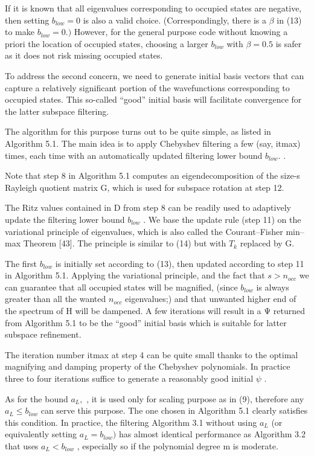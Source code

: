 \documentclass[
  10
]{article}
\begin{document}
If it is known that all eigenvalues corresponding to occupied states are
negative, then setting \(b _ { l o w } = 0\) is also a valid choice.
(Correspondingly, there is a \(\beta\) in (13) to make
\(b _ { l o w } = 0 . )\) However, for the general purpose code without
knowing a priori the location of occupied states, choosing a larger
\(b _ { l o w }\) with \(\beta = 0 . 5\) is safer as it does not risk
missing occupied states.

To address the second concern, we need to generate initial basis vectors
that can capture a relatively significant portion of the wavefunctions
corresponding to occupied states. This so-called ``good'' initial basis
will facilitate convergence for the latter subspace filtering.

The algorithm for this purpose turns out to be quite simple, as listed
in Algorithm 5.1. The main idea is to apply Chebyshev filtering a few
(say, itmax) times, each time with an automatically updated filtering
lower bound \(b _ { l o w } .\) .

Note that step 8 in Algorithm 5.1 computes an eigendecomposition of the
size-s Rayleigh quotient matrix G, which is used for subspace rotation
at step 12.

The Ritz values contained in D from step 8 can be readily used to
adaptively update the filtering lower bound \(b _ { l o w }\) . We base
the update rule (step 11) on the variational principle of eigenvalues,
which is also called the Courant--Fisher min--max Theorem {[}43{]}. The
principle is similar to (14) but with \(T _ { k }\) replaced by G.

The first \(b _ { l o w }\) is initially set according to (13), then
updated according to step 11 in Algorithm 5.1. Applying the variational
principle, and the fact that \(s > n _ { o c c }\) we can guarantee that
all occupied states will be magnified, (since \(b _ { l o w }\) is
always greater than all the wanted \(n _ { o c c }\) eigenvalues;) and
that unwanted higher end of the spectrum of H will be dampened. A few
iterations will result in a Ψ returned from Algorithm 5.1 to be the
``good'' initial basis which is suitable for latter subspace refinement.

The iteration number itmax at step 4 can be quite small thanks to the
optimal magnifying and damping property of the Chebyshev polynomials. In
practice three to four iterations suffice to generate a reasonably good
initial \(\psi\) .

As for the bound \(a _ { L } ,\) , it is used only for scaling purpose
as in (9), therefore any \(a _ { L } \leq b _ { l o w }\) can serve this
purpose. The one chosen in Algorithm 5.1 clearly satisfies this
condition. In practice, the filtering Algorithm 3.1 without using
\(a _ { L }\) (or equivalently setting \(a _ { L } = b _ { l o w } )\)
has almost identical performance as Algorithm 3.2 that uses
\(a _ { L } < b _ { l o w }\) , especially so if the polynomial degree m
is moderate.
\end{document}
